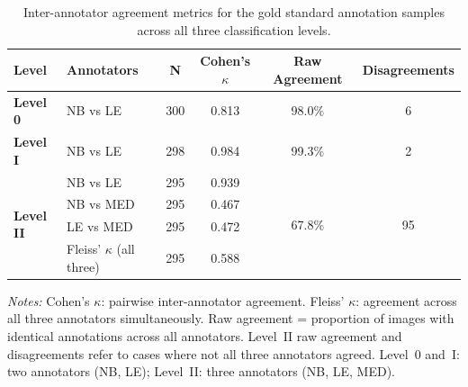 \documentclass[hidelinks, 11pt]{article}
\begin{document}
\begin{table}[h]
\centering
\caption{Inter-annotator agreement metrics for the gold standard annotation
samples across all three classification levels.}
\label{tab:annotation_agreement}
\begin{tabular}{llcccc}
\hline
\textbf{Level} & \textbf{Annotators} & \textbf{N} & \textbf{Cohen's $\kappa$} & \textbf{Raw Agreement} & \textbf{Disagreements} \\
\hline
\textbf{Level 0}
    & NB vs LE                     & 300 & 0.813 & 98.0\% & 6  \\
\hline
\textbf{Level I}
    & NB vs LE                     & 298 & 0.984 & 99.3\% & 2  \\
\hline
\multirow{4}{*}{\textbf{Level II}}
    & NB vs LE                     & 295 & 0.939 & \multirow{4}{*}{67.8\%} & \multirow{4}{*}{95} \\
    & NB vs MED                    & 295 & 0.467 & & \\
    & LE vs MED                    & 295 & 0.472 & & \\
    & Fleiss' $\kappa$ (all three) & 295 & 0.588 & & \\
\hline
\end{tabular}
\begin{minipage}{\textwidth}
\bigskip\raggedright\small
\textit{Notes:} Cohen's $\kappa$: pairwise inter-annotator agreement.
Fleiss' $\kappa$: agreement across all three annotators simultaneously.
Raw agreement = proportion of images with identical annotations across
all annotators. Level~II raw agreement and disagreements refer to cases
where not all three annotators agreed. Level~0 and~I: two annotators
(NB, LE); Level~II: three annotators (NB, LE, MED).
\end{minipage}
\end{table}
\end{document}
